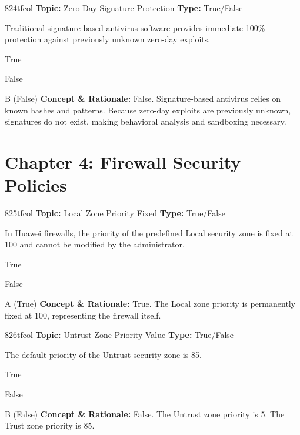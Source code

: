 \begin{qcard}{824}{tfcol}
\textcolor{darkslate!75}{\small\textbf{Topic:} Zero-Day Signature Protection \hfill \textbf{Type:} True/False}\vspace{0.4em}\par
Traditional signature-based antivirus software provides immediate 100\% protection against previously unknown zero-day exploits.
\begin{qoptions}
\item True
\item False
\end{qoptions}
\end{qcard}
\nopagebreak
\begin{explainbox}{B (False)}
\textbf{Concept \& Rationale:} False. Signature-based antivirus relies on known hashes and patterns. Because zero-day exploits are previously unknown, signatures do not exist, making behavioral analysis and sandboxing necessary.
\end{explainbox}

\section{Chapter 4: Firewall Security Policies}

\begin{qcard}{825}{tfcol}
\textcolor{darkslate!75}{\small\textbf{Topic:} Local Zone Priority Fixed \hfill \textbf{Type:} True/False}\vspace{0.4em}\par
In Huawei firewalls, the priority of the predefined Local security zone is fixed at 100 and cannot be modified by the administrator.
\begin{qoptions}
\item True
\item False
\end{qoptions}
\end{qcard}
\nopagebreak
\begin{explainbox}{A (True)}
\textbf{Concept \& Rationale:} True. The Local zone priority is permanently fixed at 100, representing the firewall itself.
\end{explainbox}

\begin{qcard}{826}{tfcol}
\textcolor{darkslate!75}{\small\textbf{Topic:} Untrust Zone Priority Value \hfill \textbf{Type:} True/False}\vspace{0.4em}\par
The default priority of the Untrust security zone is 85.
\begin{qoptions}
\item True
\item False
\end{qoptions}
\end{qcard}
\nopagebreak
\begin{explainbox}{B (False)}
\textbf{Concept \& Rationale:} False. The Untrust zone priority is 5. The Trust zone priority is 85.
\end{explainbox}

